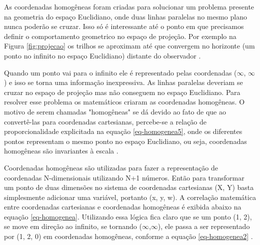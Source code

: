 \label{ap:coordenadas-homogeneas}

As coordenadas homogêneas foram criadas para solucionar um problema presente na geometria do espaço Euclidiano, onde duas linhas paralelas no mesmo plano nunca poderão se cruzar. Isso só é interessante até o ponto em que precisamos definir o comportamento geometrico no espaço de projeção. Por exemplo na Figura \ref{fig:projecao} os trilhos se aproximam até que convergem no horizonte (um ponto no infinito no espaço Euclidiano) distante do observador \cite{homogenous}.

	\begin{figure}[h!]
		\centering
	\end{figure}

Quando um ponto vai para o infinito ele é representado pelas coordenadas ($\infty$, $\infty$) e isso se torna uma informação inexpressiva. As linhas paralelas deveriam se cruzar no espaço de projeção mas não conseguem no espaço Euclidiano. Para resolver esse problema os matemáticos criaram as coordenadas homogêneas. O motivo de serem chamadas "homogêneas" se dá devido ao fato de que ao convertê-las para coordenadas cartesianas, percebe-se a relação de proporcionalidade explicitada na equação \ref{eq-homogenea5}, onde os diferentes pontos representam o mesmo ponto no espaço Euclidiano, ou seja, coordenadas homogêneas são invariantes à escala \cite{homogenous}.

Coordenadas homogêneas são utilizadas para fazer a representação de coordenadas N-dimensionais utilizando N+1 números. Então para transformar um ponto de duas dimensões no sistema de coordenadas cartesianas (X, Y) basta simplesmente adicionar uma variável, portanto (x, y, w). A correlação matemática entre coordenadas cartesianas e coordenadas homogêneas é exibida abaixo na equação \ref{eq-homogenea}. Utilizando essa lógica fica claro que se um ponto (1, 2), se move em direção ao infinito, se tornando ($\infty$,$\infty$), ele passa a ser representado por (1, 2, 0) em coordenadas homogêneas, conforme a equação \ref{eq-homogenea2} \cite{homogenous}.

